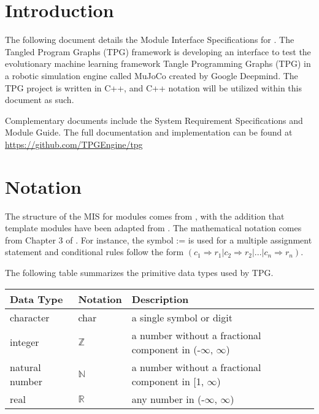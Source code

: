\documentclass[12pt, titlepage]{article}
\begin{document}
\newpage

\tableofcontents

\newpage


\section{Introduction}

The following document details the Module Interface Specifications for
\progname{}. The Tangled Program Graphs (TPG) framework is developing an interface to test the evolutionary machine learning framework Tangle Programming Graphs (TPG) in a robotic simulation engine called MuJoCo created by Google Deepmind.
The TPG project is written in C++, and C++ notation will be utilized within this document as such.



Complementary documents include the System Requirement Specifications
and Module Guide.  The full documentation and implementation can be
found at \url{https://github.com/TPGEngine/tpg} 

\section{Notation}
The structure of the MIS for modules comes from \citet{HoffmanAndStrooper1995},
with the addition that template modules have been adapted from
\cite{GhezziEtAl2003}.  The mathematical notation comes from Chapter 3 of
\citet{HoffmanAndStrooper1995}.  For instance, the symbol := is used for a
multiple assignment statement and conditional rules follow the form $(c_1
\Rightarrow r_1 | c_2 \Rightarrow r_2 | ... | c_n \Rightarrow r_n )$.

The following table summarizes the primitive data types used by TPG. 

\begin{center}
\renewcommand{\arraystretch}{1.2}
\noindent 
\begin{tabular}{l l p{7.5cm}} 
\toprule 
\textbf{Data Type} & \textbf{Notation} & \textbf{Description}\\ 
\midrule
character & char & a single symbol or digit\\
integer & $\mathbb{Z}$ & a number without a fractional component in (-$\infty$, $\infty$) \\
natural number & $\mathbb{N}$ & a number without a fractional component in [1, $\infty$) \\
real & $\mathbb{R}$ & any number in (-$\infty$, $\infty$)\\
\bottomrule
\end{tabular} 
\end{center}
\end{document}
